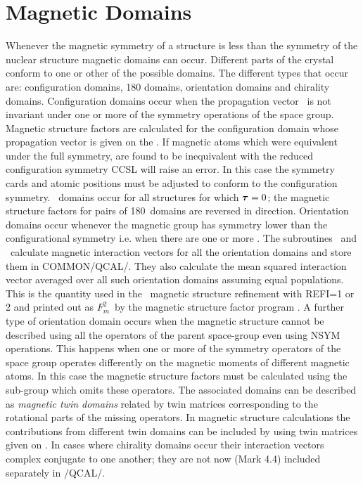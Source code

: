 \section{Magnetic Domains}
Whenever the magnetic symmetry of a structure is less than the symmetry of 
the nuclear structure magnetic domains can occur.
Different parts of 
the crystal conform to one or other of the possible domains.
The different types that occur are: configuration domains, 180\degrees
domains, orientation domains and chirality domains. 
\p
Configuration domains
occur when the propagation vector \pv\ is not invariant under one or 
more of the symmetry operations of the space group. Magnetic structure
factors are calculated for the configuration domain whose propagation
vector is given on the . If magnetic atoms which were equivalent
under the full symmetry, are found to be inequivalent with the reduced 
configuration symmetry CCSL will raise an error. In this case the symmetry 
cards 
and atomic positions must be adjusted to conform to the configuration symmetry.
\degrees\ domains occur for all 
structures for which ${\bm \tau}=0$; the magnetic structure factors for pairs of 
180\degrees\ domains are reversed in direction. 
\p
Orientation domains occur
whenever the magnetic group has symmetry lower than the configurational 
symmetry i.e. when there are one or more . 
\p
The subroutines \ and \  calculate 
magnetic interaction vectors for all the 
orientation domains and store them in COMMON/QCAL/. They also calculate
the mean squared interaction vector averaged over all such orientation
domains assuming equal populations. This is the quantity used in
the \ magnetic structure refinement with REFI=1 or 2 and printed out as $F_m^2$\ 
by the magnetic structure factor program . 
\p
A further type of orientation domain occurs when the magnetic structure cannot be 
described using all the operators of the parent space-group even using NSYM 
operations. This happens when one or more of
the symmetry operators of the space group operates differently on the magnetic moments 
of different magnetic atoms. In this case the magnetic structure factors must be calculated
using the sub-group which omits these operators. The associated domains can be described as {\em
magnetic twin domains} related by twin matrices corresponding to the rotational parts of the missing operators. 
\p
In magnetic structure calculations the contributions from different 
twin domains can be included by using twin matrices given on .  
 \p
 In cases where chirality domains occur their interaction vectors complex 
conjugate to one another; they are not now (Mark 4.4) included separately in 
/QCAL/.
